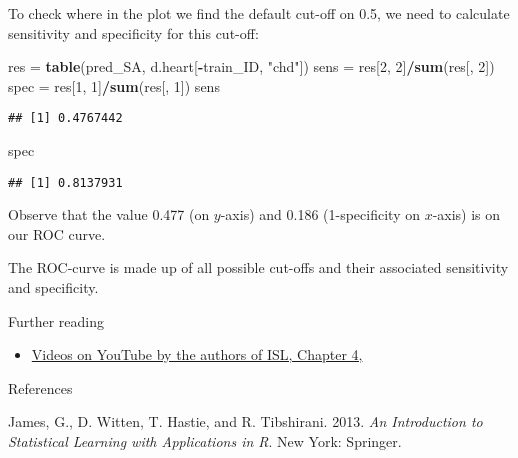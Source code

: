 \documentclass[10pt,ignorenonframetext,]{beamer}
\newenvironment{Shaded}{\begin{snugshade}}{\end{snugshade}}
\newcommand{\DecValTok}[1]{\textcolor[rgb]{0.00,0.00,0.81}{#1}}
\newcommand{\KeywordTok}[1]{\textcolor[rgb]{0.13,0.29,0.53}{\textbf{#1}}}
\newcommand{\NormalTok}[1]{#1}
\newcommand{\OperatorTok}[1]{\textcolor[rgb]{0.81,0.36,0.00}{\textbf{#1}}}
\newcommand{\StringTok}[1]{\textcolor[rgb]{0.31,0.60,0.02}{#1}}
\providecommand{\tightlist}{%
  \setlength{\itemsep}{0pt}\setlength{\parskip}{0pt}}
\begin{document}
\begin{frame}[fragile]

To check where in the plot we find the default cut-off on 0.5, we need
to calculate sensitivity and specificity for this cut-off:

\scriptsize

\begin{Shaded}
\begin{Highlighting}[]
\NormalTok{res =}\StringTok{ }\KeywordTok{table}\NormalTok{(pred_SA, d.heart[}\OperatorTok{-}\NormalTok{train_ID, }\StringTok{"chd"}\NormalTok{])}
\NormalTok{sens =}\StringTok{ }\NormalTok{res[}\DecValTok{2}\NormalTok{, }\DecValTok{2}\NormalTok{]}\OperatorTok{/}\KeywordTok{sum}\NormalTok{(res[, }\DecValTok{2}\NormalTok{])}
\NormalTok{spec =}\StringTok{ }\NormalTok{res[}\DecValTok{1}\NormalTok{, }\DecValTok{1}\NormalTok{]}\OperatorTok{/}\KeywordTok{sum}\NormalTok{(res[, }\DecValTok{1}\NormalTok{])}
\NormalTok{sens}
\end{Highlighting}
\end{Shaded}

\begin{verbatim}
## [1] 0.4767442
\end{verbatim}

\begin{Shaded}
\begin{Highlighting}[]
\NormalTok{spec}
\end{Highlighting}
\end{Shaded}

\begin{verbatim}
## [1] 0.8137931
\end{verbatim}

\normalsize

Observe that the value 0.477 (on \(y\)-axis) and 0.186 (1-specificity on
\(x\)-axis) is on our ROC curve.

The ROC-curve is made up of all possible cut-offs and their associated
sensitivity and specificity.

\end{frame}

\begin{frame}{Further reading}
\protect\hypertarget{further-reading}{}

\begin{itemize}
\tightlist
\item
  \href{https://www.youtube.com/playlist?list=PL5-da3qGB5IC4vaDba5ClatUmFppXLAhE}{Videos
  on YouTube by the authors of ISL, Chapter 4,}
\end{itemize}

\end{frame}

\begin{frame}{References}
\protect\hypertarget{references}{}

\hypertarget{refs}{}
\leavevmode\hypertarget{ref-james.etal}{}%
James, G., D. Witten, T. Hastie, and R. Tibshirani. 2013. \emph{An
Introduction to Statistical Learning with Applications in R}. New York:
Springer.

\end{frame}
\end{document}
